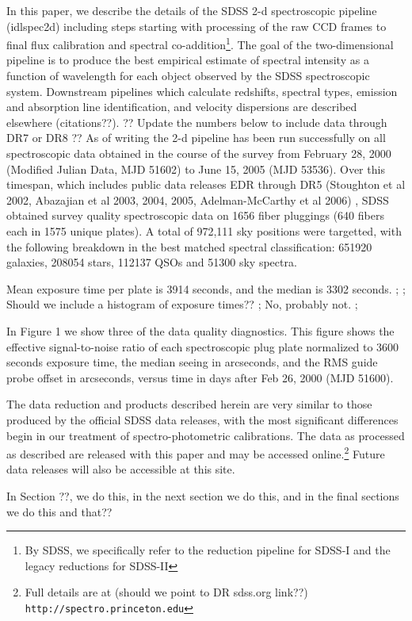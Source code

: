 \documentclass[12pt,preprint]{aastex}
\begin{document}
In this paper, we describe the details of the SDSS 2-d spectroscopic pipeline
(idlspec2d) including steps starting with processing of the raw CCD frames 
to final flux calibration and spectral co-addition\footnote{By SDSS, 
we specifically refer to the reduction pipeline for SDSS-I and the 
legacy reductions for SDSS-II}.  The goal of the two-dimensional pipeline is to
produce the best empirical estimate of spectral intensity as a function of 
wavelength for each object observed by the SDSS spectroscopic system.  
Downstream pipelines which calculate redshifts, spectral types, 
emission and absorption line identification, and velocity dispersions 
are described elsewhere (citations??).
?? Update the numbers below to include data through DR7 or DR8 ??
As of writing the 2-d pipeline has been run successfully on all spectroscopic
data obtained in the course of the survey from February 28, 2000 
(Modified Julian Data, MJD 51602) to June 15, 2005 (MJD 53536).  
Over this timespan, which includes public data 
releases EDR through DR5 (Stoughton et al 2002, 
Abazajian et al 2003, 2004, 2005, Adelman-McCarthy et al 2006)
, SDSS obtained survey quality spectroscopic data on
1656 fiber pluggings (640 fibers each in 1575 unique plates).   
A total of 972,111 sky positions were targetted, with the following 
breakdown in the best matched spectral classification:  651920 galaxies, 
208054 stars, 112137 QSOs and 51300 sky spectra.

Mean exposure time per plate is 3914 seconds, and the median is 3302 seconds.
;
;   Should we include a histogram of exposure times??
;   No, probably not.
;

In Figure 1 we show three of the data quality diagnostics. This figure shows
the effective signal-to-noise ratio of each spectroscopic plug plate 
normalized to 3600 seconds exposure time, the median seeing in arcseconds,
and the RMS guide probe offset
in arcseconds, versus time in days after Feb 26, 2000 (MJD 51600).

The data reduction and products described herein are very similar to
those produced by the official SDSS data releases, 
with the most significant differences begin in our treatment of 
spectro-photometric calibrations.  The data as processed as described
are released
with this paper and may be accessed online.\footnote{Full details
are at (should we point to DR sdss.org link??) \texttt{http://spectro.princeton.edu}}
Future data releases will also be accessible at this site. 

In Section ??, we do this, in the next section we do this, and in the final sections we do this and that??
\end{document}
